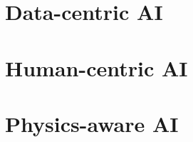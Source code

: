 \documentclass[a4paper,12pt,times,print,authoryear,index]{Classes/PhDThesisPSnPDF}
\begin{document}
\frontmatter

% 
\newpage
% 

% 



\tableofcontents

\mainmatter
\sloppy
% 








\part{Data-centric AI}\label{part:data-centric}





\part{Human-centric AI}\label{part:human-centric}
% 





\part{Physics-aware AI}\label{part:physics-aware}
% 


% 
% 







\end{document}
